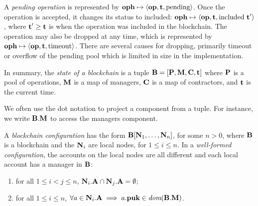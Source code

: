 \documentclass[runningheads]{llncs}
\begin{document}
A \emph{pending operation} is represented by
$\textbf{oph} \mapsto \langle  \textbf{op}, \textbf{t}, \text{pending}\rangle $.
Once the operation is accepted, it changes its status to included:
$\textbf{oph} \mapsto \langle  \textbf{op}, \textbf{t}, \text{included}\ \textbf{t}'\rangle $, where
$\textbf{t}' \ge \textbf{t}$ is  when the operation was included in the
blockchain.  The operation may also be dropped at any time, which is
represented by
$\textbf{oph} \mapsto \langle  \textbf{op}, \textbf{t}, \text{timeout}\rangle $. There are several
causes for dropping, primarily timeout or overflow of the pending
pool which is limited in size in the implementation.




In summary, the \emph{state of a blockchain} is a tuple
$\textbf{B} = [\textbf{P}, \textbf{M}, \textbf{C}, \textbf{t}]$ where
$\textbf{P}$ is a pool of operations, $\textbf{M}$ is a map of managers,
$\textbf{C}$ is a map of contractors, and $\textbf{t}$ is the current
time. 

We often use the dot notation to project a component from a tuple. For
instance, we write $\textbf{B}.\textbf{M}$ to access the managers
component. 

A \emph{blockchain configuration} has the form
$\textbf{B}[ \textbf{N}_1, \dots, \textbf{N}_n]$, for some $n>0$, where $\textbf{B}$ is a
blockchain and the $\textbf{N}_i$ are local nodes, for $1\le i\le n$.
In a \emph{well-formed configuration}, the accounts on the local nodes are all different and each
local account has a manager in $\textbf{B}$:
\begin{enumerate}
\item for all $1\le i< j\le n$, $\textbf{N}_i.\textbf{A} \cap
  \textbf{N}_j.\textbf{A} = \emptyset$;
\item for all $1\le i \le n$, 
    $\forall a \in \textbf{N}_i.\textbf{A} \implies a.\textbf{puk} \in \textit{dom}( \textbf{B}.\textbf{M})$.
\end{enumerate}
\end{document}
